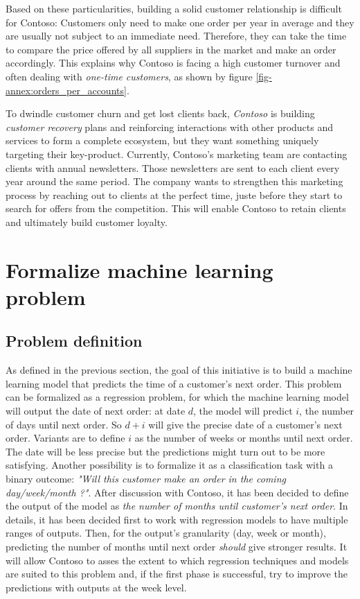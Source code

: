  Based on these particularities, building a solid customer relationship is difficult for Contoso: Customers only need to make one order per year in average and they are usually not subject to an immediate need. Therefore, they can take the time to compare the price offered by all suppliers in the market and make an order accordingly. This explains why Contoso is facing a high customer turnover and often dealing with \textit{one-time customers}, as shown by figure \ref{fig-annex:orders_per_accounts}.
 
 
 To dwindle customer churn and get lost clients back, \textit{Contoso} is building \textit{customer recovery} plans and reinforcing interactions with other products and services to form a complete ecosystem, but they want something uniquely targeting their key-product. Currently, Contoso's marketing team are contacting clients with annual newsletters. Those newsletters are sent to each client every year around the same period. The company wants to strengthen this marketing process by reaching out to clients at the perfect time, juste before they start to search for offers from the competition. This will enable Contoso to retain clients and ultimately build customer loyalty.
 
 
\section{Formalize machine learning problem} \label{sec:ml-metrics}


\subsection{Problem definition}
As defined in the previous section, the goal of this initiative is to build a machine learning model that predicts the time of a customer's next order. This problem can be formalized as a regression problem, for which the machine learning model will output the date of next order: at date $d$, the model will predict $i$, the number of days until next order. So $d+i$ will give the precise date of a customer's next order. Variants are to define $i$ as the number of weeks or months until next order. The date will be less precise but the predictions might turn out to be more satisfying. Another possibility is to formalize it as a classification task with a binary outcome: \textit{"Will this customer make an order in the coming day/week/month ?"}. After discussion with Contoso, it has been decided to define the output of the model as \textit{the number of months until customer's next order}. In details, it has been decided first to work with regression models to have multiple ranges of outputs. Then, for the output's granularity (day, week or month), predicting the number of months until next order \textit{should} give stronger results. It will allow Contoso to asses the extent to which regression techniques and models are suited to this problem and, if the first phase is successful, try to improve the predictions with outputs at the week level.



